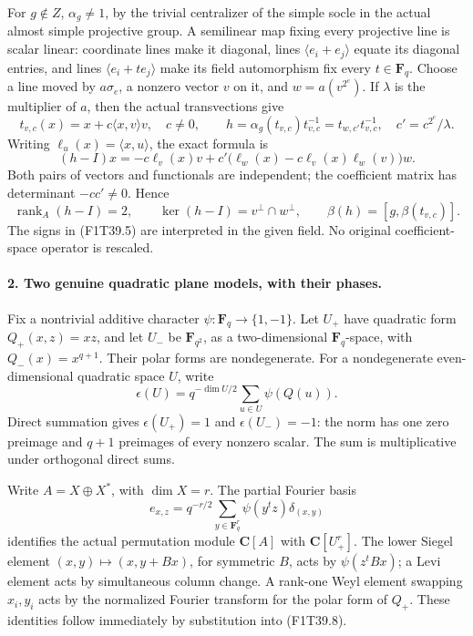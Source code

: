 For \(g\notin Z\), \(\alpha_g\ne1\), by the trivial
centralizer of the simple socle in the actual almost simple
projective group. A semilinear map fixing every projective
line is scalar linear: coordinate lines make it diagonal,
lines \(\langle e_i+e_j\rangle\) equate its diagonal
entries, and lines \(\langle e_i+t e_j\rangle\) make its
field automorphism fix every \(t\in\mathbf F_q\).
Choose a line moved by \(a\sigma_e\), a nonzero vector
\(v\) on it, and \(w=a(v^{2^e})\). If \(\lambda\) is
the multiplier of \(a\), then the actual transvections give
\[
 t_{v,c}(x)=x+c\langle x,v\rangle v,
 \quad c\ne0,\qquad
 h=\alpha_g(t_{v,c})t_{v,c}^{-1}
     =t_{w,c'}t_{v,c}^{-1},\quad c'=c^{2^e}/\lambda.
 \tag{F1T39.4}
\]
Writing \(\ell_u(x)=\langle x,u\rangle\), the exact formula is
\[
 (h-I)x=-c\ell_v(x)v+
 c'\bigl(\ell_w(x)-c\ell_v(x)\ell_w(v)\bigr)w.
 \tag{F1T39.5}
\]
Both pairs of vectors and functionals are independent; the
coefficient matrix has determinant \(-cc'\ne0\). Hence
\[
 \operatorname{rank}_A(h-I)=2,
 \qquad \ker(h-I)=v^\perp\cap w^\perp,
 \qquad \beta(h)=[g,\beta(t_{v,c})].
 \tag{F1T39.6}
\]
The signs in (F1T39.5) are interpreted in the given field.
No original coefficient-space operator is rescaled.

\paragraph{2. Two genuine quadratic plane models, with their phases.}
Fix a nontrivial additive character
\(\psi:\mathbf F_q\to\{1,-1\}\).
Let \(U_+\) have quadratic form \(Q_+(x,z)=xz\), and
let \(U_-\) be \(\mathbf F_{q^2}\), as a two-dimensional
\(\mathbf F_q\)-space, with \(Q_-(x)=x^{q+1}\).
Their polar forms are nondegenerate. For a nondegenerate
even-dimensional quadratic space \(U\), write
\[
 \epsilon(U)=q^{-\dim U/2}\sum_{u\in U}\psi(Q(u)).
 \tag{F1T39.7}
\]
Direct summation gives \(\epsilon(U_+)=1\) and
\(\epsilon(U_-)=-1\): the norm has one zero preimage
and \(q+1\) preimages of every nonzero scalar.
The sum is multiplicative under orthogonal direct sums.

Write \(A=X\oplus X^*\), with \(\dim X=r\).
The partial Fourier basis
\[
 e_{x,z}=q^{-r/2}\sum_{y\in\mathbf F_q^r}
                 \psi(y^t z)\delta_{(x,y)}
 \tag{F1T39.8}
\]
identifies the actual permutation module \(\mathbf C[A]\)
with \(\mathbf C[U_+^r]\). The lower Siegel element
\((x,y)\mapsto(x,y+Bx)\), for symmetric \(B\), acts by
\(\psi(z^tBx)\); a Levi element acts by simultaneous
column change. A rank-one Weyl element swapping \(x_i,y_i\)
acts by the normalized Fourier transform for the polar form
of \(Q_+\). These identities follow immediately by
substitution into (F1T39.8).

